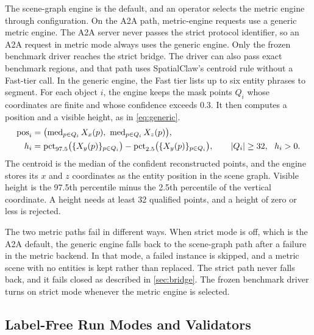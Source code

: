 \documentclass{article}
\begin{document}
The scene-graph engine is the default, and an operator selects the metric engine through configuration. On the A2A path, metric-engine requests use a generic metric engine. The A2A server never passes the strict protocol identifier, so an A2A request in metric mode always uses the generic engine. Only the frozen benchmark driver reaches the strict bridge. The driver can also pass exact benchmark regions, and that path uses SpatialClaw's centroid rule without a Fast-tier call. In the generic engine, the Fast tier lists up to six entity phrases to segment. For each object $i$, the engine keeps the mask points $Q_i$ whose coordinates are finite and whose confidence exceeds 0.3. It then computes a position and a visible height, as in \cref{eq:generic}.
\begin{align}
  \text{pos}_i &= \bigl(\operatorname{med}_{p \in Q_i} X_x(p),\ \operatorname{med}_{p \in Q_i} X_z(p)\bigr), \notag\\
  h_i &= \operatorname{pct}_{97.5}\bigl(\{X_y(p)\}_{p \in Q_i}\bigr) - \operatorname{pct}_{2.5}\bigl(\{X_y(p)\}_{p \in Q_i}\bigr), \qquad \lvert Q_i \rvert \ge 32,\ \ h_i > 0. \label{eq:generic}
\end{align}
The centroid is the median of the confident reconstructed points, and the engine stores its $x$ and $z$ coordinates as the entity position in the scene graph. Visible height is the 97.5th percentile minus the 2.5th percentile of the vertical coordinate. A height needs at least 32 qualified points, and a height of zero or less is rejected.

The two metric paths fail in different ways. When strict mode is off, which is the A2A default, the generic engine falls back to the scene-graph path after a failure in the metric backend. In that mode, a failed instance is skipped, and a metric scene with no entities is kept rather than replaced. The strict path never falls back, and it fails closed as described in \cref{sec:bridge}. The frozen benchmark driver turns on strict mode whenever the metric engine is selected.

\subsection{Label-Free Run Modes and Validators}
\label{sec:runmodes}
\end{document}

